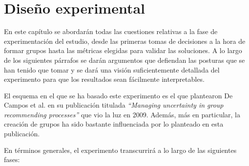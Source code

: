 \chapter{Diseño experimental}

En este capítulo se abordarán todas las cuestiones relativas a la fase de experimentación del estudio, desde las primeras tomas de decisiones a la hora de formar grupos hasta las métricas elegidas para validar las soluciones. A lo largo de los siguientes párrafos se darán argumentos que defiendan las posturas que se han tenido que tomar y se dará una visión suficientemente detallada del experimento para que los resultados sean fácilmente interpretables.

El esquema en el que se ha basado este experimento es el que plantearon De Campos et al. en su publicación titulada \textit{``Managing uncertainty in group recommending processes''} \cite{umuai} que vio la luz en 2009. Además, más en particular, la creación de grupos ha sido bastante influenciada por lo planteado en esta publicación.

En términos generales, el experimento transcurrirá a lo largo de las siguientes fases:

